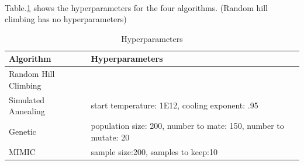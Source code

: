 \documentclass[11pt]{article}
\begin{document}
\\Table.\ref{tab:hy_ts} shows the hyperparameters for the four algorithms. (Random hill climbing has no hyperparameters)
\begin{table}[h!]
  \begin{center}
    \caption{Hyperparameters}
    \label{tab:hy_ts}
    \begin{tabular}{l|l}
      \textbf{Algorithm} & \textbf{Hyperparameters}\\
      \hline
      Random Hill Climbing & \\
      Simulated Annealing &  start temperature: 1E12, cooling exponent: .95\\
      Genetic & population size: 200, number to mate: 150, number to mutate: 20\\
      MIMIC & sample size:200, samples to keep:10\\
    \end{tabular}
  \end{center}
\end{table}
\end{document}
